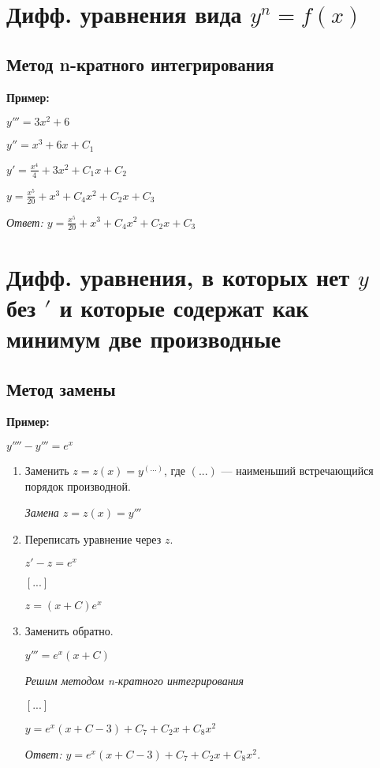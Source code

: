 \documentclass[10pt, a4paper]{article}
\begin{document}
\section{Дифф. уравнения вида $y^{n} = f(x)$}
\subsection{Метод n-кратного интегрирования}
\textbf{Пример:}
    \par $y''' = 3x^2 + 6$
    \par $y''  = x^3 + 6x + C_{1}$
    \par $y'   = \frac{x^4}{4} + 3x^2 + C_{1}x + C_{2}$
    \par $y    = \frac{x^5}{20} + x^3 + C_{4}x^2 + C_{2}x + C_{3}$
    \par\textit{Ответ: $y = \frac{x^5}{20} + x^3 + C_{4}x^2 + C_{2}x + C_{3}$}

\section{Дифф. уравнения, в которых нет $y$ без $'$ и которые содержат как минимум две производные}
\subsection{Метод замены}
\textbf{Пример:}
\par $y'''' - y''' = e^x$
\begin{enumerate}
    \item Заменить $z = z(x) = y^{(...)}$, где $(...)$ — наименьший встречающийся порядок производной.
        \par\textit{Замена $z = z(x) = y'''$}
    \item Переписать уравнение через $z$.
        \par $z' - z = e^x$
        \par $[...]$
        \par $z = (x + C)e^x$
    \item Заменить обратно.
        \par $y''' = e^x(x + C)$
        \par\textit{Решим методом n-кратного интегрирования}
        \par $[...]$
        \par $y = e^x(x + C - 3) + C_{7} + C_{2}x + C_{8}x^2$
        \par\textit{Ответ: $y = e^x(x + C - 3) + C_{7} + C_{2}x + C_{8}x^2$.}
\end{enumerate}
\end{document}
